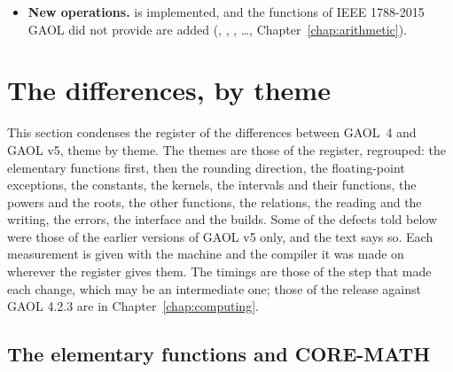 \begin{itemize}
   is the empty set. Every string is an expression, where an
  interval may stand wherever a number may (), an uncertain
  number being no bound ( is refused) and needing a blank
  after a sign next to it ( is refused,
   is read), and an error anywhere
  stops the reading. The reader knows every function of GAOL, and
   reads the names of IEEE 1788-2015
  (, \ldots). The format  writes interval
  literals, which are read back bit for bit, a zero bound as $+0$; the
  decimal formats round the
  bounds outward whatever the C library, and the format  keeps
  the digits of each bound (Chapter~\ref{chap:io}).
\item[$\bullet$] \textbf{New operations.}  is implemented, and
  the functions of IEEE 1788-2015 GAOL did not provide are added
  (, , , \ldots,
  Chapter~\ref{chap:arithmetic}).
\end{itemize}

\section{The differences, by theme}\label{sec:migration-themes}
%

This section condenses the register of the differences between GAOL~4 and
GAOL v5, theme by theme. The themes are those of the register, regrouped: the
elementary functions first, then the rounding direction, the floating-point
exceptions, the constants, the kernels, the intervals and their functions, the
powers and the roots, the other functions, the relations, the reading and the
writing, the errors, the interface and the builds. Some of the defects told
below were those of the earlier versions of GAOL v5 only, and the text says
so. Each measurement is given with the machine and the compiler it was made
on wherever the register gives them. The timings are those of the step that
made each change, which may be an intermediate one; those of the release
against GAOL 4.2.3 are in Chapter~\ref{chap:computing}.

\subsection{The elementary functions and CORE-MATH}
\label{sec:changes-core-math}
%

